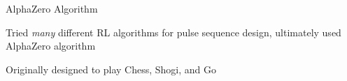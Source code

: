 \documentclass{beamer}
\begin{document}
\begin{frame}{AlphaZero Algorithm}

Tried \emph{many} different RL algorithms for pulse sequence design, ultimately used AlphaZero algorithm \cite{Silver1140}

Originally designed to play Chess, Shogi, and Go



\begin{figure}
\centering
\scalebox{.7}{

}
\end{figure}


\end{frame}
\end{document}
